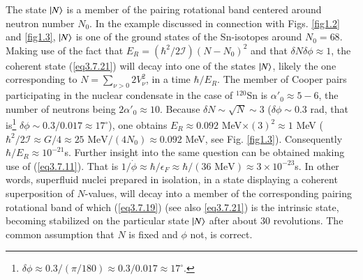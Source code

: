 The state $|{N} \rangle$ is a member of the pairing rotational band centered around neutron number $N_0$. In the example discussed in connection with Figs. \ref{fig1.2} and \ref{fig1.3}, $|{N} \rangle$ is one of the ground states of the Sn-isotopes around $N_0=68$. Making use of the fact that $E_R=\left(\hbar^2/2\mathcal I\right)(N-N_0)^2$ and that $\delta N\delta\phi\approx1$, the coherent state (\ref{eq3.7.21}) will decay into one of the states $|{N} \rangle$, likely the one corresponding to $N=\sum_{\nu>0}2V_\nu^2$, in a time $\hbar/E_R$. The member of  Cooper pairs participating in the nuclear condensate in the case of $^{120}$Sn is $\alpha'_0\approx5-6$, the number of neutrons being $2\alpha'_0\approx10$. Because $\delta N\sim\sqrt{N}\sim3$ ($\delta\phi\sim0.3$ rad, that is\footnote{$\delta\phi\approx0.3/(\pi/180)\approx0.3/0.017\approx17^\circ$.} $\delta\phi\sim0.3/0.017\approx 17^\circ$), one obtains $E_R\approx0.092$ MeV$\times(3)^2\approx 1$ MeV ($\hbar^2/2\mathcal I\approx G/4\approx 25\text{ MeV}/(4N_0)\approx0.092$ MeV, see Fig. \ref{fig1.3}). Consequently $\hbar/E_R\approx10^{-21}$s. Further insight into the same question can be obtained making use of (\ref{eq3.7.11}). That is $1/\dot\phi\approx\hbar/\epsilon_F\approx\hbar/(36\text{ MeV})\approx3\times10^{-23}$s. In other words, superfluid nuclei prepared in isolation, in a state displaying a coherent superposition of $N$-values, will decay into a member of the corresponding pairing rotational band of which (\ref{eq3.7.19}) (see also \ref{eq3.7.21}) is the intrinsic state, becoming stabilized on the particular state $|{N} \rangle$ after about 30 revolutions. The common assumption that $N$ is fixed and $\phi$ not, is correct.


